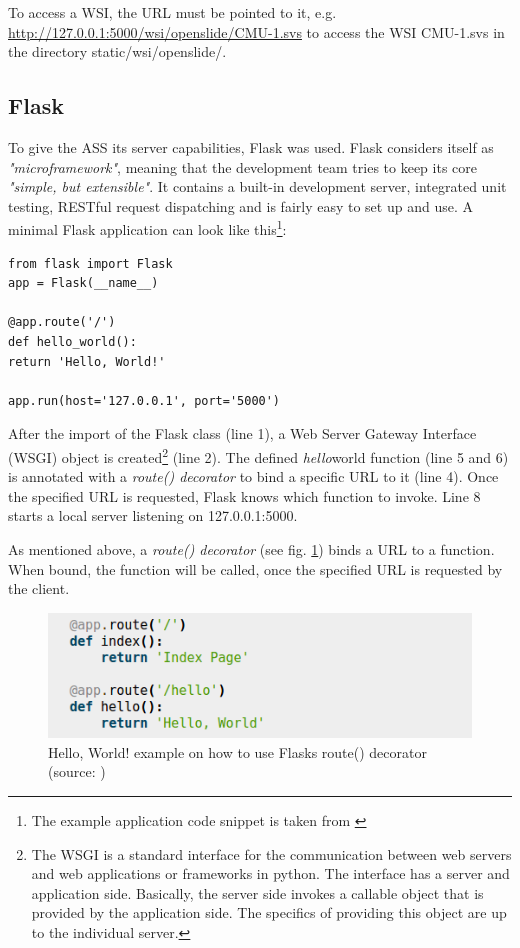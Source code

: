 To access a WSI, the URL must be pointed to it, e.g. \url{http://127.0.0.1:5000/wsi/openslide/CMU-1.svs} to access the WSI CMU-1.svs in the directory static/wsi/openslide/.


\subsection{Flask}
\label{sec4_flask}
To give the ASS its server capabilities, Flask was used. Flask considers itself as \emph{"microframework"}, meaning that the development team tries to keep its core \emph{"simple, but extensible"}\cite{web:flask}. It contains a built-in development server, integrated unit testing, RESTful request dispatching and is fairly easy to set up and use. A minimal Flask application can look like this\footnote{The example application code snippet is taken from \cite{web:flask}}:

\begin{lstlisting}[frame=single]
from flask import Flask
app = Flask(__name__)

@app.route('/')
def hello_world():
return 'Hello, World!'

app.run(host='127.0.0.1', port='5000')
\end{lstlisting}

After the import of the Flask class (line 1), a Web Server Gateway Interface (WSGI) object is created\footnote{The WSGI is a standard interface for the communication between web servers and web applications or frameworks in python. The interface has a server and application side. Basically, the server side invokes a callable object that is provided by the application side. The specifics of providing this object are up to the individual server\cite{Brandl16}.} (line 2). The defined \emph{hello\textunderscore}world function (line 5 and 6) is annotated with a \emph{route() decorator} to bind a specific URL to it (line 4). Once the specified URL is requested, Flask knows which function to invoke. Line 8 starts a local server listening on 127.0.0.1:5000.

As mentioned above, a \emph{route() decorator} (see fig. \ref{fig4_routeDecorator}) binds a URL to a function. When bound, the function will be called, once the specified URL is requested by the client\cite{web:flask}.

\begin{figure}[H]
	\begin{center}
		\includegraphics[scale=0.5]{img/route.png}
		\caption{Hello, World! example on how to use Flasks route() decorator (source: \cite{web:flask})}
		\label{fig4_routeDecorator}
	\end{center}
\end{figure}

